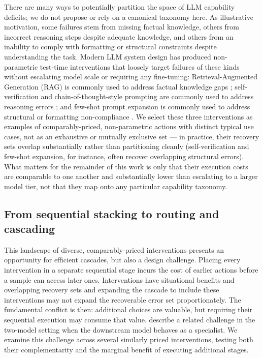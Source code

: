 \documentclass[sigconf]{acmart}
\begin{document}
There are many ways to potentially partition the space of LLM capability deficits; we do not propose or rely on a canonical taxonomy here. As illustrative motivation, some failures stem from missing factual knowledge, others from incorrect reasoning steps despite adequate knowledge, and others from an inability to comply with formatting or structural constraints despite understanding the task. Modern LLM system design has produced non-parametric test-time interventions that loosely target failures of these kinds without escalating model scale or requiring any fine-tuning: Retrieval-Augmented Generation (RAG) is commonly used to address factual knowledge gaps \cite{NEURIPS2020_6b493230}; self-verification and chain-of-thought-style prompting are commonly used to address reasoning errors \cite{selfrefine, selfverify}; and few-shot prompt expansion is commonly used to address structural or formatting non-compliance \cite{icl}. We select these three interventions as examples of comparably-priced, non-parametric actions with distinct typical use cases, not as an exhaustive or mutually exclusive set — in practice, their recovery sets overlap substantially rather than partitioning cleanly (self-verification and few-shot expansion, for instance, often recover overlapping structural errors). What matters for the remainder of this work is only that their execution costs are comparable to one another and substantially lower than escalating to a larger model tier, not that they map onto any particular capability taxonomy.
 
\subsection{From sequential stacking to routing and cascading}
 
This landscape of diverse, comparably-priced interventions presents an opportunity for efficient cascades, but also a design challenge. Placing every intervention in a separate sequential stage incurs the cost of earlier actions before a sample can access later ones. Interventions have situational benefits and overlapping recovery sets and expanding the cascade to include these interventions may not expand the recoverable error set proportionately. The fundamental conflict is then: additional choices are valuable, but requiring their sequential execution may consume that value. \citet{jitkrittum} describe a related challenge in the two-model setting when the downstream model behaves as a specialist. We examine this challenge across several similarly priced interventions, testing both their complementarity and the marginal benefit of executing additional stages.
\end{document}
